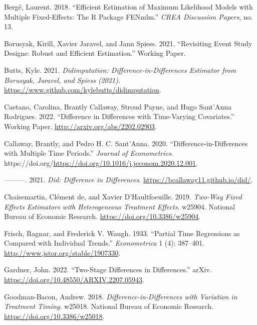 \hypertarget{refs}{}
\begin{CSLReferences}{1}{0}
\leavevmode{}%
Bergé, Laurent. 2018. {``Efficient Estimation of Maximum Likelihood Models with Multiple Fixed-Effects: The {R} Package {FENmlm}.''} \emph{CREA Discussion Papers}, no. 13.

\leavevmode{}%
Borusyak, Kirill, Xavier Jaravel, and Jann Spiess. 2021. {``Revisiting Event Study Designs: Robust and Efficient Estimation.''} Working Paper.

\leavevmode{}%
Butts, Kyle. 2021. \emph{Didimputation: Difference-in-Differences Estimator from Borusyak, Jaravel, and Spiess (2021)}. \url{https://www.github.com/kylebutts/didimputation}.

\leavevmode{}%
Caetano, Carolina, Brantly Callaway, Stroud Payne, and Hugo Sant'Anna Rodrigues. 2022. {``Difference in Differences with Time-Varying Covariates.''} Working Paper. \url{http://arxiv.org/abs/2202.02903}.

\leavevmode{}%
Callaway, Brantly, and Pedro H. C. Sant'Anna. 2020. {``Difference-in-Differences with Multiple Time Periods.''} \emph{Journal of Econometrics}. https://doi.org/\url{https://doi.org/10.1016/j.jeconom.2020.12.001}.

\leavevmode{}%
---------. 2021. \emph{Did: Difference in Differences}. \url{https://bcallaway11.github.io/did/}.

\leavevmode{}%
Chaisemartin, Clément de, and Xavier D'Haultfoeuille. 2019. \emph{Two-Way Fixed Effects Estimators with Heterogeneous Treatment Effects}. w25904. National Bureau of Economic Research. \url{https://doi.org/10.3386/w25904}.

\leavevmode{}%
Frisch, Ragnar, and Frederick V. Waugh. 1933. {``Partial Time Regressions as Compared with Individual Trends.''} \emph{Econometrica} 1 (4): 387--401. \url{http://www.jstor.org/stable/1907330}.

\leavevmode{}%
Gardner, John. 2022. {``Two-Stage Differences in Differences.''} arXiv. \url{https://doi.org/10.48550/ARXIV.2207.05943}.

\leavevmode{}%
Goodman-Bacon, Andrew. 2018. \emph{Difference-in-Differences with Variation in Treatment Timing}. w25018. National Bureau of Economic Research. \url{https://doi.org/10.3386/w25018}.


\end{CSLReferences}
